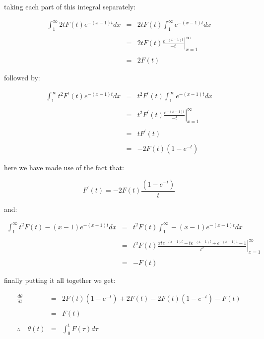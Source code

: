 taking each part of this integral separately: \bigskip

\begin{eqnarray*}
	\int_{1}^{\infty} 2 t F(t) e^{-(x - 1)t} dx & = & 2 t F(t) \int_{1}^{\infty} e^{-(x - 1)t} dx \\\\
												& = & 2 t F(t) \left. \frac{e^{-(x - 1)t}}{-t} \right|_{x = 1}^{\infty} \\\\
												& = & 2 F(t)
\end{eqnarray*}\medskip

followed by: \bigskip

\begin{eqnarray*}
	\int_{1}^{\infty} t^2 F^{\prime}(t) e^{-(x - 1)t} dx & = & t^2 F^{\prime}(t) \int_{1}^{\infty} e^{-(x - 1)t} dx \\\\
														 & = & t^2 F^{\prime}(t) \left. \frac{e^{-(x - 1)t}}{-t} \right|_{x = 1}^{\infty} \\\\
														 & = & t F^{\prime}(t) \\\\
														 & = & -2 F(t) (1 - e^{-t})
\end{eqnarray*}\medskip

here we have made use of the fact that: \bigskip

\[
	F^{\prime}(t) = -2 F(t) \frac{(1 - e^{-t})}{t}
\]\medskip

and: \bigskip

\begin{eqnarray*}
	\int_{1}^{\infty} t^2 F(t) -(x - 1) e^{-(x - 1)t} dx & = & t^2 F(t) \int_{1}^{\infty} -(x - 1) e^{-(x - 1)t} dx \\\\
														 & = & t^2 F(t) \left.  \frac{ x t e^{-(x - 1)t} - t e^{-(x - 1)t} + e^{-(x - 1)t} - 1 }{t^2}  \right|_{x = 1}^{\infty} \\\\
														 & = & -F(t) 
\end{eqnarray*}\medskip

finally putting it all together we get: \bigskip

\begin{eqnarray*}
		   \frac{d \theta}{dt} & = & 2 F(t) (1 - e^{-t}) + 2 F(t) - 2 F(t) (1 - e^{-t}) - F(t) \\\\
							   & = & F(t) \\\\
	\therefore \quad \theta(t) & = & \int_{0}^{t} F(\tau) d\tau
\end{eqnarray*}\medskip


